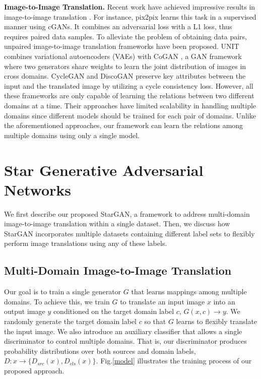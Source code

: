 \documentclass[10pt,twocolumn,letterpaper]{article}
\begin{document}
\noindent \textbf{Image-to-Image Translation.} Recent work have achieved impressive results in image-to-image translation \cite{Isola_2017_CVPR, kim2017learning,liu2017unsupervised,zhu2017unpaired}. For instance, pix2pix \cite{Isola_2017_CVPR} learns this task in a supervised manner using cGANs\cite{mirza2014conditional}. It combines an adversarial loss with a L1 loss, thus requires paired data samples. To alleviate the problem of obtaining data pairs, unpaired image-to-image translation frameworks \cite{kim2017learning,liu2017unsupervised,zhu2017unpaired} have been proposed.
UNIT \cite{liu2017unsupervised} combines variational autoencoders (VAEs) \cite{kingma2013auto} with CoGAN \cite{liu2016coupled}, a GAN framework where two generators share weights to learn the joint distribution of images in cross domains. CycleGAN \cite{zhu2017unpaired} and DiscoGAN \cite{kim2017learning} preserve key attributes between the input and the translated image by utilizing a cycle consistency loss. However, all these frameworks are only capable of learning the relations between two different domains at a time. Their approaches have limited scalability in handling multiple domains since different models should be trained for each pair of domains. Unlike the aforementioned approaches, our framework can learn the relations among multiple domains using only a single model.



\section{Star Generative Adversarial Networks} \label{stargan}

We first describe our proposed StarGAN, a framework to address multi-domain image-to-image translation within a single dataset. Then, we discuss how StarGAN  incorporates multiple datasets containing different label sets to flexibly perform image translations using any of these labels. 
\subsection{Multi-Domain Image-to-Image Translation} 
Our goal is to train a single generator $G$ that learns mappings among multiple domains. To achieve this, we train $G$ to translate an input image $x$  into an output image $y$ conditioned on the target domain label $c$, $G(x, c) \rightarrow y$. 
We randomly generate the target domain label $c$ so that $G$ learns to flexibly translate the input image. We also introduce an auxiliary classifier \cite{odena2016conditional} that allows a single discriminator to control multiple domains. That is,  our discriminator produces probability distributions over both sources and domain labels, $D: x \rightarrow \{{D}_{src}(x), {D}_{cls}(x)\}$. Fig.\thinspace\ref{model} illustrates the training process of our proposed approach.
\end{document}
